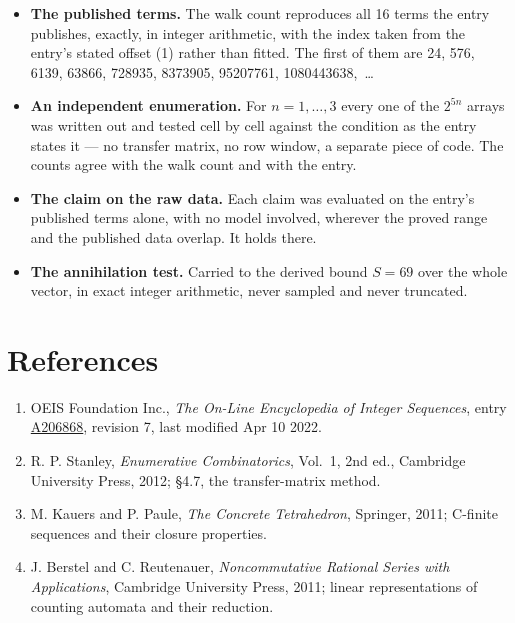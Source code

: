 \documentclass[11pt]{article}
\theoremstyle{definition}
\begin{document}
\begin{itemize}

\item {\bfseries The published terms.} The walk count reproduces all 16 terms the entry publishes, exactly, in integer arithmetic, with the index taken from the entry's stated offset (1) rather than fitted. The first of them are 24, 576, 6139, 63866, 728935, 8373905, 95207761, 1080443638,~\dots

\item {\bfseries An independent enumeration.} For $n = 1,\dots,3$ every one of the $2^{5n}$ arrays was written out and tested cell by cell against the condition as the entry states it --- no transfer matrix, no row window, a separate piece of code. The counts agree with the walk count and with the entry.

\item {\bfseries The claim on the raw data.} Each claim was evaluated on the entry's published terms alone, with no model involved, wherever the proved range and the published data overlap. It holds there.

\item {\bfseries The annihilation test.} Carried to the derived bound $S = 69$ over the whole vector, in exact integer arithmetic, never sampled and never truncated.

\end{itemize}

\section{References}

\begin{enumerate}

\item OEIS Foundation Inc., \emph{The On-Line Encyclopedia of Integer Sequences}, entry \href{https://oeis.org/A206868}{A206868}, revision 7, last modified Apr 10 2022.

\item R. P. Stanley, \emph{Enumerative Combinatorics}, Vol.~1, 2nd ed., Cambridge University Press, 2012; \S4.7, the transfer-matrix method.

\item M. Kauers and P. Paule, \emph{The Concrete Tetrahedron}, Springer, 2011; C-finite sequences and their closure properties.

\item J. Berstel and C. Reutenauer, \emph{Noncommutative Rational Series with Applications}, Cambridge University Press, 2011; linear representations of counting automata and their reduction.

\end{enumerate}
\end{document}
